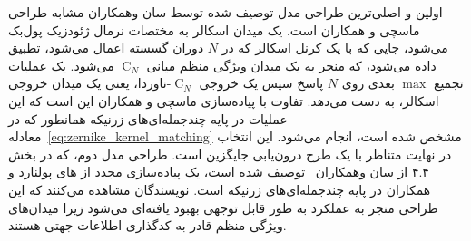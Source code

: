اولین و اصلی‌ترین طراحی مدل توصیف شده توسط سان وهمکاران\cite{sun2018zernet} مشابه طراحی ماسچی و همکاران\cite{masci2015geodesic} است.
یک میدان اسکالر به مختصات نرمال ژئودزیک پول‌بک می‌شود، جایی که با یک کرنل اسکالر که در $N$ دوران گسسته اعمال می‌شود، تطبیق داده می‌شود، که منجر به یک میدان ویژگی منظم میانی $\operatorname{C}_N$ می‌شود.
یک عملیات تجمیع $\max$ بعدی روی $N$ پاسخ سپس یک خروجی $\operatorname{C}_N$-ناوردا، یعنی یک میدان خروجی اسکالر، به دست می‌دهد.
تفاوت با پیاده‌سازی ماسچی و همکاران\cite{masci2015geodesic} این است که این عملیات در پایه چندجمله‌ای‌های زرنیکه همانطور که در معادله~\eqref{eq:zernike_kernel_matching} مشخص شده است، انجام می‌شود.
این انتخاب در نهایت متناظر با یک طرح درون‌یابی جایگزین است.
طراحی مدل دوم، که در بخش ۴.۴ از سان وهمکاران~\cite{sun2018zernet} توصیف شده است، یک پیاده‌سازی مجدد از های پولنارد و همکاران\cite{poulenard2018multi} در پایه چندجمله‌ای‌های زرنیکه است.
نویسندگان مشاهده می‌کنند که این طراحی منجر به عملکرد به طور قابل توجهی بهبود یافته‌ای می‌شود زیرا میدان‌های ویژگی منظم قادر به کدگذاری اطلاعات جهتی هستند.





